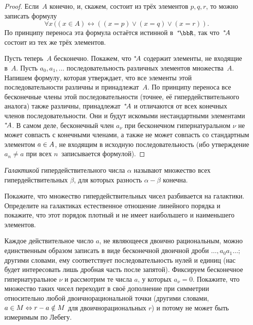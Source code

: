 \begin{proof}
Если~$A$ конечно, и, скажем, состоит из трёх элементов $p,q,r$,
то можно записать формулу
        $$
\forall x\, ((x\in A) \leftrightarrow ((x=p)\lor (x=q)\lor (x=r)).
        $$
По принципу переноса эта формула остаётся истинной в~$\nstR$,
так что~${}^*\!A$ состоит из тех же трёх элементов.

Пусть теперь~$A$ бесконечно. Покажем, что ${}^*\!A$ содержит
элементы, не входящие в~$A$. Пусть $a_0,a_1,\ldots$\т
последовательность различных элементов множества~$A$. Напишем
формулу, которая утверждает, что все элементы этой
последовательности различны и принадлежат~$A$. По принципу
переноса все бесконечные члены этой последовательности (точнее,
её гипердействительного аналога) также различны,
принадлежат~${}^*\!A$ и отличаются от всех конечных членов
последовательности. Они и будут искомыми нестандартными
элементами~${}^*\!A$. В самом деле, бесконечный член $a_\nu$ при
бесконечном гипернатуральном $\nu$ не может совпасть с конечными
членами, а также не может совпасть со стандартным элементом
$a\hm\in A$, не входящим в исходную последовательность (ибо
утверждение  $a_n\ne a$ при всех $n$\ записывается
формулой).
\end{proof}

\emph{Галактикой}%
%
гипердействительного числа $\alpha$ называют
множество всех гипердействительных $\beta$, для которых разность
$\alpha-\beta$ конечна.

\begin{problem}
Покажите, что множество гипердействительных чисел разбивается на
галактики. Определите на галактиках естественное отношение линейного
порядка и покажите, что этот порядок плотный и не имеет наибольшего
и наименьшего элементов.
\end{problem}

\begin{problem}
Каждое действительное число $a$, не являющееся двоично\д
рациональным, можно единственным образом записать в виде
бесконечной двоичной дроби $\ldots,a_0a_1\dots$; другими
словами, ему соответствует последовательность нулей и единиц
(нас будет интересовать лишь дробная часть после запятой).
Фиксируем бесконечное гипернатуральное $\nu$ и рассмотрим те
числа $a$, у которых $a_\nu=0$. Покажите, что множество таких
чисел переходит в своё дополнение при симметрии относительно
любой двоично\д рациональной точки (другими словами, ${a\in
M}\hm\Leftrightarrow {r-a\notin M}$ для двоично\д рациональных $r$)
и потому не может быть измеримым по Лебегу.%
\end{problem}

